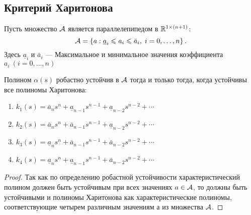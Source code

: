 \documentclass[../../TAU.tex]{subfiles}
\begin{document}
\subsection{Критерий Харитонова}

    Пусть множество $\mathcal{A}$ является параллелепипедом в $\mathbb{R}^{1\times (n+1)}$:
    $$
        \mathcal{A}=\left\{a: \underline{ a}_i\leqslant a_i \leqslant \bar a_i, \; i=0,\ldots,n\right\}.
    $$
    Здесь $\underline{a}_i$ и $\bar a_i$ ---
    Максимальное и минимальное значения коэффициента $a_i\ (i=0,\dots,n)$

    \begin{theor}
        Полином $\alpha(s)$ робастно устойчив в $\mathcal{A}$ тогда и только тогда, когда устойчивы все полиномы Харитонова:
        \begin{enumerate}
            \item 
                $k_1(s) = \bar{a}_n s^n + \underline{ a}_{n-1} s^{n-1} + \underline{ a}_{n-2} s^{n-2} + \cdots$\\
            \item 
                $k_2(s) = \bar a_n s^n + \bar a_{n-1} s^{n-1} + \underline{ a}_{n-2} s^{n-2} + \cdots$\\
            \item 
                $k_3(s) = \underline{ a}_n s^n + \bar a_{n-1} s^{n-1} + \bar a_{n-2} s^{n-2} + \cdots$\\
            \item 
                $k_4(s) = \underline{ a}_n s^n + \underline{ a}_{n-1} s^{n-1} + \bar a_{n-2} s^{n-2} + \cdots$
        \end{enumerate}

    \end{theor}

    \begin{proof}
        Так как по определению робастной устойчивости характеристический полином должен быть устойчивым при всех значениях $a\in \mathcal{A}$, то должны быть устойчивыми и полиномы Харитонова как характеристические полиномы, соответствующие четырем различным значениям $а$ из множества $\mathcal{A}$.
    \end{proof}
\end{document}
